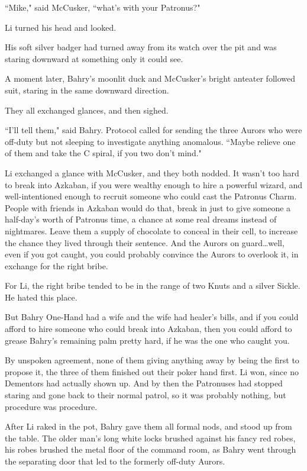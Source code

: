 ``Mike," said McCusker, ``what's with your Patronus?"

Li turned his head and looked.

His soft silver badger had turned away from its watch over the pit and was staring downward at something only it could see.

A moment later, Bahry's moonlit duck and McCusker's bright anteater followed suit, staring in the same downward direction.

They all exchanged glances, and then sighed.

``I'll tell them," said Bahry. Protocol called for sending the three Aurors who were off-duty but not sleeping to investigate anything anomalous. ``Maybe relieve one of them and take the C spiral, if you two don't mind."

Li exchanged a glance with McCusker, and they both nodded. It wasn't too hard to break into Azkaban, if you were wealthy enough to hire a powerful wizard, and well-intentioned enough to recruit someone who could cast the Patronus Charm. People with friends in Azkaban would do that, break in just to give someone a half-day's worth of Patronus time, a chance at some real dreams instead of nightmares. Leave them a supply of chocolate to conceal in their cell, to increase the chance they lived through their sentence. And the Aurors on guard…well, even if you got caught, you could probably convince the Aurors to overlook it, in exchange for the right bribe.

For Li, the right bribe tended to be in the range of two Knuts and a silver Sickle. He hated this place.

But Bahry One-Hand had a wife and the wife had healer's bills, and if you could afford to hire someone who could break into Azkaban, then you could afford to grease Bahry's remaining palm pretty hard, if he was the one who caught you.

By unspoken agreement, none of them giving anything away by being the first to propose it, the three of them finished out their poker hand first. Li won, since no Dementors had actually shown up. And by then the Patronuses had stopped staring and gone back to their normal patrol, so it was probably nothing, but procedure was procedure.

After Li raked in the pot, Bahry gave them all formal nods, and stood up from the table. The older man's long white locks brushed against his fancy red robes, his robes brushed the metal floor of the command room, as Bahry went through the separating door that led to the formerly off-duty Aurors.

